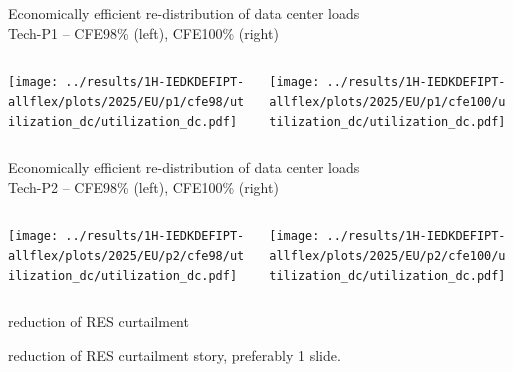 
\begin{frame}{Economically efficient re-distribution of data center loads \\
  Tech-P1 -- CFE98\% (left), CFE100\% (right)}

  \begin{columns}[T]
  \begin{column}{6cm}
    \centering
    \texttt{[image: ../results/1H-IEDKDEFIPT-allflex/plots/2025/EU/p1/cfe98/utilization\_dc/utilization\_dc.pdf]}
  \end{column}

  \begin{column}{6cm}
    \centering
    \texttt{[image: ../results/1H-IEDKDEFIPT-allflex/plots/2025/EU/p1/cfe100/utilization\_dc/utilization\_dc.pdf]}  
  \end{column}
  \end{columns}

\end{frame}


\begin{frame}{Economically efficient re-distribution of data center loads \\
  Tech-P2 -- CFE98\% (left), CFE100\% (right)}

  \begin{columns}[T]
  \begin{column}{6cm}
    \centering
    \texttt{[image: ../results/1H-IEDKDEFIPT-allflex/plots/2025/EU/p2/cfe98/utilization\_dc/utilization\_dc.pdf]}
  \end{column}

  \begin{column}{6cm}
    \centering
    \texttt{[image: ../results/1H-IEDKDEFIPT-allflex/plots/2025/EU/p2/cfe100/utilization\_dc/utilization\_dc.pdf]}  
  \end{column}
  \end{columns}

\end{frame}



\begin{frame}{reduction of RES curtailment}

  {\footnotesize
  \vspace{0.2cm}

  reduction of RES curtailment story, preferably 1 slide.


  }
\end{frame}


